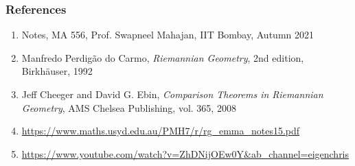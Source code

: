 \begin{frame}
\frametitle{References}

\begin{enumerate}

\item
Notes, MA 556, Prof. Swapneel Mahajan, IIT Bombay, Autumn 2021

\item
Manfredo Perdigão do Carmo, \textit{Riemannian Geometry}, 2nd edition, 	Birkhäuser, 1992

\item
Jeff Cheeger and David G. Ebin, \textit{Comparison Theorems in Riemannian Geometry}, AMS Chelsea Publishing, vol. 365, 2008


\item
\url{https://www.maths.usyd.edu.au/PMH7/r/rg_emma_notes15.pdf}

\item
\url{https://www.youtube.com/watch?v=ZhDNijOEw0Y&ab_channel=eigenchris}


\end{enumerate}

\end{frame}